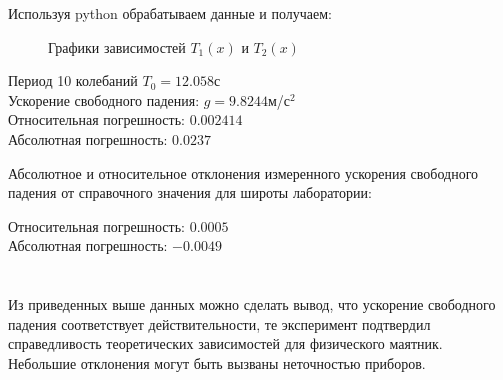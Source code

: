 \documentclass[a4paper]{article}
\begin{document}
Используя python обрабатываем данные и получаем:
\begin{figure}[H]
\caption{Графики зависимостей $T_1(x)$ и $T_2(x)$}
\end{figure}
\begin{center}
Период 10 колебаний $T_0=12.058$с\\
Ускорение свободного падения: $g=9.8244$м/с$^2$\\
Относительная погрешность: $0.002414$\\
Абсолютная погрешность: $0.0237$
\end{center}
Абсолютное и относительное отклонения измеренного ускорения свободного падения от справочного значения для широты
лаборатории:\\
\begin{center}
Относительная погрешность: $0.0005$\\
Абсолютная погрешность: $-0.0049$
\end{center}
\section{}
Из приведенных выше данных можно сделать вывод, что ускорение свободного падения соответствует действительности, те эксперимент подтвердил справедливость теоретических зависимостей для физического маятник. Небольшие отклонения могут быть вызваны неточностью приборов.
\end{document}
